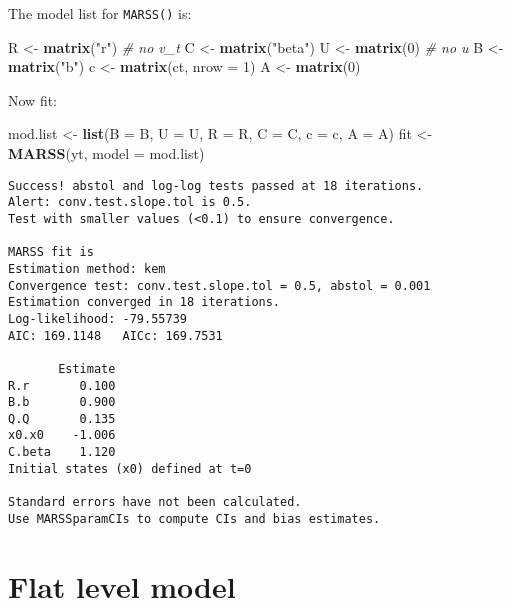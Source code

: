 \documentclass[12pt,]{book}
\newenvironment{Shaded}{\begin{snugshade}}{\end{snugshade}}
\newcommand{\CommentTok}[1]{\textcolor[rgb]{0.56,0.35,0.01}{\textit{#1}}}
\newcommand{\DataTypeTok}[1]{\textcolor[rgb]{0.13,0.29,0.53}{#1}}
\newcommand{\DecValTok}[1]{\textcolor[rgb]{0.00,0.00,0.81}{#1}}
\newcommand{\KeywordTok}[1]{\textcolor[rgb]{0.13,0.29,0.53}{\textbf{#1}}}
\newcommand{\NormalTok}[1]{#1}
\newcommand{\StringTok}[1]{\textcolor[rgb]{0.31,0.60,0.02}{#1}}
\begin{document}
The model list for \texttt{MARSS()} is:

\begin{Shaded}
\begin{Highlighting}[]
\NormalTok{R <-}\StringTok{ }\KeywordTok{matrix}\NormalTok{(}\StringTok{"r"}\NormalTok{)  }\CommentTok{# no v_t}
\NormalTok{C <-}\StringTok{ }\KeywordTok{matrix}\NormalTok{(}\StringTok{"beta"}\NormalTok{)}
\NormalTok{U <-}\StringTok{ }\KeywordTok{matrix}\NormalTok{(}\DecValTok{0}\NormalTok{)  }\CommentTok{# no u}
\NormalTok{B <-}\StringTok{ }\KeywordTok{matrix}\NormalTok{(}\StringTok{"b"}\NormalTok{)}
\NormalTok{c <-}\StringTok{ }\KeywordTok{matrix}\NormalTok{(ct, }\DataTypeTok{nrow =} \DecValTok{1}\NormalTok{)}
\NormalTok{A <-}\StringTok{ }\KeywordTok{matrix}\NormalTok{(}\DecValTok{0}\NormalTok{)}
\end{Highlighting}
\end{Shaded}

Now fit:

\begin{Shaded}
\begin{Highlighting}[]
\NormalTok{mod.list <-}\StringTok{ }\KeywordTok{list}\NormalTok{(}\DataTypeTok{B =}\NormalTok{ B, }\DataTypeTok{U =}\NormalTok{ U, }\DataTypeTok{R =}\NormalTok{ R, }\DataTypeTok{C =}\NormalTok{ C, }\DataTypeTok{c =}\NormalTok{ c, }\DataTypeTok{A =}\NormalTok{ A)}
\NormalTok{fit <-}\StringTok{ }\KeywordTok{MARSS}\NormalTok{(yt, }\DataTypeTok{model =}\NormalTok{ mod.list)}
\end{Highlighting}
\end{Shaded}

\begin{verbatim}
Success! abstol and log-log tests passed at 18 iterations.
Alert: conv.test.slope.tol is 0.5.
Test with smaller values (<0.1) to ensure convergence.

MARSS fit is
Estimation method: kem 
Convergence test: conv.test.slope.tol = 0.5, abstol = 0.001
Estimation converged in 18 iterations. 
Log-likelihood: -79.55739 
AIC: 169.1148   AICc: 169.7531   
 
       Estimate
R.r       0.100
B.b       0.900
Q.Q       0.135
x0.x0    -1.006
C.beta    1.120
Initial states (x0) defined at t=0

Standard errors have not been calculated. 
Use MARSSparamCIs to compute CIs and bias estimates.
\end{verbatim}

\hypertarget{flat-level-model}{%
\section{Flat level model}\label{flat-level-model}}
\end{document}
